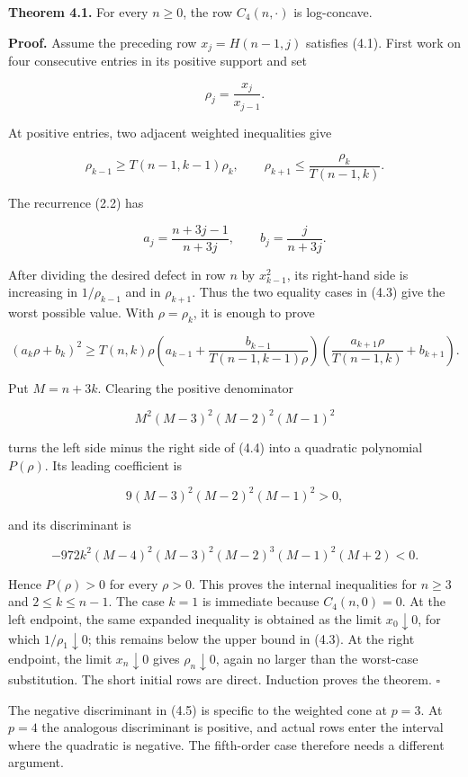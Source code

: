 \documentclass[11pt]{article}
\numberwithin{equation}{section}
\begin{document}
\textbf{Theorem 4.1.} For every $n\ge0$, the row $C_4(n,\cdot)$ is log-concave.

\textbf{Proof.} Assume the preceding row $x_j=H(n-1,j)$ satisfies (4.1). First work on four
consecutive entries in its positive support and set

\[
\rho_j=\frac{x_j}{x_{j-1}}.
\]

At positive entries, two adjacent weighted inequalities give

\[
\rho_{k-1}\ge T(n-1,k-1)\rho_k,
\qquad
\rho_{k+1}\le\frac{\rho_k}{T(n-1,k)}.
\tag{4.3}
\]

The recurrence (2.2) has

\[
a_j=\frac{n+3j-1}{n+3j},
\qquad
b_j=\frac{j}{n+3j}.
\]

After dividing the desired defect in row $n$ by $x_{k-1}^2$, its right-hand side is
increasing in $1/\rho_{k-1}$ and in $\rho_{k+1}$. Thus the two equality cases in (4.3)
give the worst possible value. With $\rho=\rho_k$, it is enough to prove

\[
(a_k\rho+b_k)^2\ge T(n,k)\rho
\left(a_{k-1}+\frac{b_{k-1}}{T(n-1,k-1)\rho}\right)
\left(\frac{a_{k+1}\rho}{T(n-1,k)}+b_{k+1}\right).
\tag{4.4}
\]

Put $M=n+3k$. Clearing the positive denominator

\[
M^2(M-3)^2(M-2)^2(M-1)^2
\]

turns the left side minus the right side of (4.4) into a quadratic polynomial
$P(\rho)$. Its leading coefficient is

\[
9(M-3)^2(M-2)^2(M-1)^2>0,
\]

and its discriminant is

\[
-972k^2(M-4)^2(M-3)^2(M-2)^3(M-1)^2(M+2)<0.
\tag{4.5}
\]

Hence $P(\rho)>0$ for every $\rho>0$. This proves the internal inequalities for
$n\ge3$ and $2\le k\le n-1$. The case $k=1$ is immediate because $C_4(n,0)=0$.
At the left endpoint, the same expanded inequality is obtained as the limit
$x_0\downarrow0$, for which $1/\rho_1\downarrow0$; this remains below the upper bound in
(4.3). At the right endpoint, the limit $x_n\downarrow0$ gives $\rho_n\downarrow0$, again
no larger than the worst-case substitution. The short
initial rows are direct. Induction proves the theorem. $\square$

The negative discriminant in (4.5) is specific to the weighted cone at $p=3$. At $p=4$
the analogous discriminant is positive, and actual rows enter the interval where the
quadratic is negative. The fifth-order case therefore needs a different argument.
\end{document}
